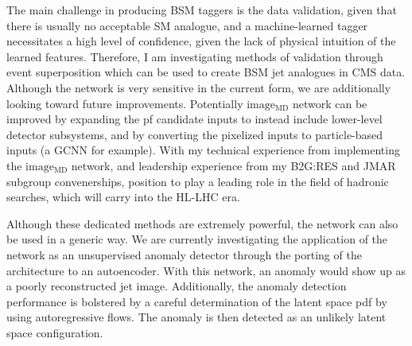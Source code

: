 \documentclass[12pt]{article}
\begin{document}
The main challenge in producing BSM taggers is the data validation, given that there
is usually no acceptable SM analogue, and a machine-learned tagger necessitates a
high level of confidence, given the lack of physical intuition of the learned features.
Therefore, I am investigating methods of validation through event superposition
which can be used to create BSM jet analogues in CMS data.  Although the network is
very sensitive in the current form, we are additionally looking toward future improvements.
Potentially $\mathrm{image_{MD}}$ network can be improved by expanding the pf candidate inputs to
instead include lower-level detector subsystems, and by converting the pixelized inputs
to particle-based inputs (a GCNN for example).  With my technical experience from implementing the
$\mathrm{image_{MD}}$ network, and leadership experience from my
B2G:RES and JMAR subgroup convenerships, position to play a leading role in the
field of hadronic searches, which will carry into the HL-LHC era.

Although these dedicated methods are
extremely powerful, the network can also be used in a generic way.
We are currently investigating the application of the network as an unsupervised
anomaly detector through the porting of the architecture to an autoencoder.
With this network, an anomaly would show up as a poorly reconstructed jet image.
Additionally, the anomaly detection performance is bolstered by a careful determination of the latent space pdf by using autoregressive flows.
The anomaly is then detected as an unlikely latent space configuration.
\end{document}
